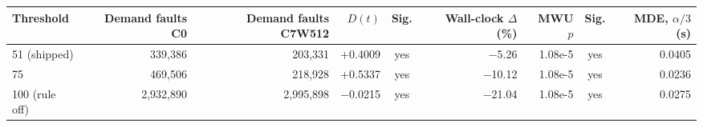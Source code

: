 \begin{tabular}{@{}lrrrcrrcr@{}}
\toprule
Threshold & Demand faults C0 & Demand faults C7W512 & $D(t)$ & Sig. & Wall-clock $\Delta$ (\%) & MWU $p$ & Sig. & MDE, $\alpha/3$ (s) \\
\midrule
51 (shipped) & 339{,}386 & 203{,}331 & +0.4009 & yes & $-$5.26 & 1.08e-5 & yes & 0.0405 \\ %
75 & 469{,}506 & 218{,}928 & +0.5337 & yes & $-$10.12 & 1.08e-5 & yes & 0.0236 \\ %
100 (rule off) & 2{,}932{,}890 & 2{,}995{,}898 & $-$0.0215 & yes & $-$21.04 & 1.08e-5 & yes & 0.0275 \\ %
\bottomrule
\end{tabular}
